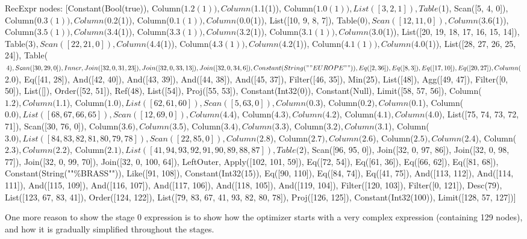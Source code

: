 \documentclass[a4paper,12pt]{scrreprt}
\begin{document}
\begin{exprlisting}
RecExpr { nodes: [Constant(Bool(true)), Column($1.2(1)), Column($1.1(1)), Column($1.0(1)), List([3, 2, 1]), Table($1), Scan([5, 4, 0]), Column($0.3(1)), Column($0.2(1)), Column($0.1(1)), Column($0.0(1)), List([10, 9, 8, 7]), Table($0), Scan([12, 11, 0]), Column($3.6(1)), Column($3.5(1)), Column($3.4(1)), Column($3.3(1)), Column($3.2(1)), Column($3.1(1)), Column($3.0(1)), List([20, 19, 18, 17, 16, 15, 14]), Table($3), Scan([22, 21, 0]), Column($4.4(1)), Column($4.3(1)), Column($4.2(1)), Column($4.1(1)), Column($4.0(1)), List([28, 27, 26, 25, 24]), Table($4), Scan([30, 29, 0]), Inner, Join([32, 0, 31, 23]), Join([32, 0, 33, 13]), Join([32, 0, 34, 6]), Constant(String(""EUROPE"")), Eq([2, 36]), Eq([8, 3]), Eq([17, 10]), Eq([20, 27]), Column($2.0), Eq([41, 28]), And([42, 40]), And([43, 39]), And([44, 38]), And([45, 37]), Filter([46, 35]), Min(25), List([48]), Agg([49, 47]), Filter([0, 50]), List([]), Order([52, 51]), Ref(48), List([54]), Proj([55, 53]), Constant(Int32(0)), Constant(Null), Limit([58, 57, 56]), Column($1.2), Column($1.1), Column($1.0), List([62, 61, 60]), Scan([5, 63, 0]), Column($0.3), Column($0.2), Column($0.1), Column($0.0), List([68, 67, 66, 65]), Scan([12, 69, 0]), Column($4.4), Column($4.3), Column($4.2), Column($4.1), Column($4.0), List([75, 74, 73, 72, 71]), Scan([30, 76, 0]), Column($3.6), Column($3.5), Column($3.4), Column($3.3), Column($3.2), Column($3.1), Column($3.0), List([84, 83, 82, 81, 80, 79, 78]), Scan([22, 85, 0]), Column($2.8), Column($2.7), Column($2.6), Column($2.5), Column($2.4), Column($2.3), Column($2.2), Column($2.1), List([41, 94, 93, 92, 91, 90, 89, 88, 87]), Table($2), Scan([96, 95, 0]), Join([32, 0, 97, 86]), Join([32, 0, 98, 77]), Join([32, 0, 99, 70]), Join([32, 0, 100, 64]), LeftOuter, Apply([102, 101, 59]), Eq([72, 54]), Eq([61, 36]), Eq([66, 62]), Eq([81, 68]), Constant(String(""\%BRASS"")), Like([91, 108]), Constant(Int32(15)), Eq([90, 110]), Eq([84, 74]), Eq([41, 75]), And([113, 112]), And([114, 111]), And([115, 109]), And([116, 107]), And([117, 106]), And([118, 105]), And([119, 104]), Filter([120, 103]), Filter([0, 121]), Desc(79), List([123, 67, 83, 41]), Order([124, 122]), List([79, 83, 67, 41, 93, 82, 80, 78]), Proj([126, 125]), Constant(Int32(100)), Limit([128, 57, 127])] }
\end{exprlisting}

One more reason to show the stage 0 expression is to show how the optimizer starts with a very complex expression (containing 129 nodes), and how it is gradually simplified throughout the stages. \\
\end{document}
